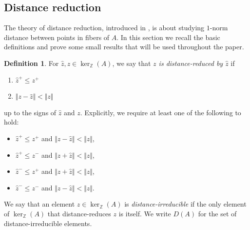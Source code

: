 \documentclass[a4paper, 12pt]{article}
\newcommand{\NN}{\mathbb N}
\newcommand{\ZZ}{\mathbb Z}
\theoremstyle{plain}
\theoremstyle{definition}
\newtheorem{definition}[theorem]{Definition}
\theoremstyle{remark}
\begin{document}
\subsection{Distance reduction}

The theory of distance reduction, introduced in \cite{aoki2005distance}, is about studying $1$-norm distance between points in fibers of $A$. In this section we recall the basic definitions and prove some small results that will be used throughout the paper.

\vspace{1.5mm}

\begin{definition}\label{def:drbouquet}
    For $\hat z,z \in \ker_{\ZZ}(A)$, we say that \textit{$z$ is distance-reduced by $\hat z$} if
    \begin{enumerate}
        \item \label{item:drbouquet1} $\hat z^+ \le z^+$
        \item \label{item:drbouquet2} $\Vert z - \hat z \Vert < \Vert z \Vert$
    \end{enumerate}
    up to the signs of $\hat z$ and $z$.
    Explicitly, we require at least one of the following to hold:
    \begin{itemize}
        \item $\hat z^+ \le z^+$ and $\Vert z - \hat z \Vert < \Vert z \Vert$,
        \item $\hat z^+ \le z^-$ and $\Vert z + \hat z \Vert < \Vert z \Vert$,
        \item $\hat z^- \le z^+$ and $\Vert z + \hat z \Vert < \Vert z \Vert$,
        \item $\hat z^- \le z^-$ and $\Vert z - \hat z \Vert < \Vert z \Vert$.
    \end{itemize}
    We say that an element $z \in \ker_\ZZ(A)$ is \textit{distance-irreducible} if the only element of $\ker_\ZZ(A)$ that distance-reduces $z$ is itself. We write $D(A)$ for the set of distance-irreducible elements.
\end{definition}




\end{document}
